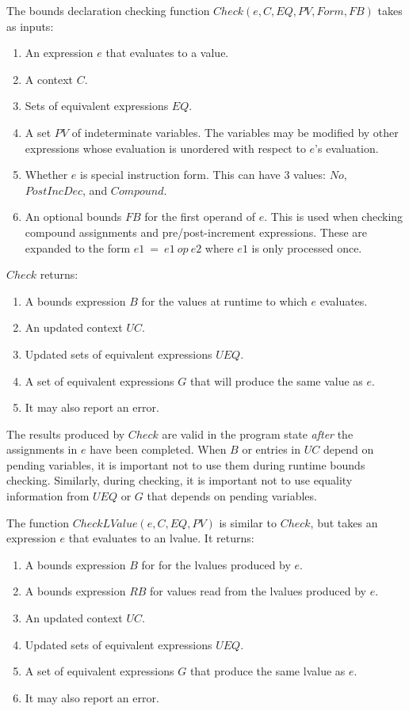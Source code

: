 The bounds declaration checking function $Check(e, C, EQ, PV, Form, FB)$ takes as inputs:
\begin{enumerate}
\item An expression $e$ that evaluates to a value.
\item A context $C$.
\item Sets of equivalent expressions $EQ$.
\item A set $PV$ of indeterminate variables.  The variables 
may be modified by other expressions whose  evaluation is unordered with respect to $e$'s evaluation.
\item Whether $e$ is special instruction form.  This can have 3 values: $No$, $PostIncDec$,
and $Compound$.
\item An optional bounds $FB$ for the first operand of $e$.  
This is used when checking compound assignments and pre/post-increment expressions.  These are
expanded to the form $e1~=~e1~op~e2$ where $e1$ is only processed once. 
\end{enumerate}

$Check$ returns:
\begin{enumerate}
\item A bounds expression $B$ for the values at runtime to which $e$ evaluates.
\item An updated context $UC$.
\item Updated sets of equivalent expressions $UEQ$.
\item A set of equivalent expressions $G$ that will produce the same value as $e$. 
\item It may also report an error.
\end{enumerate}
The results produced by $Check$ are valid in the program state
{\em after} the assignments in $e$ have been completed.   When $B$ or entries in 
$UC$ depend on pending variables, it is important not to use them during runtime bounds checking.
Similarly, during checking, it is important not to use equality information
from $UEQ$ or $G$ that depends on pending variables.

The function $CheckLValue(e, C, EQ, PV)$ is similar to $Check$, but takes an
expression $e$ that evaluates to an lvalue.  It returns:
\begin{enumerate}
\item A bounds expression $B$ for for the lvalues produced by $e$.
\item A bounds expression $RB$ for values read from the lvalues produced by $e$.
\item An updated context $UC$.
\item Updated sets of equivalent expressions $UEQ$.
\item A set of equivalent expressions $G$ that produce the same lvalue as $e$. 
\item It may also report an error.
\end{enumerate}


